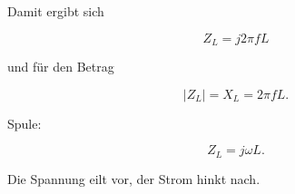 Damit ergibt sich

\begin{equation}
	\boxed{
		Z_L = j2\pi f L
	}
	\label{eq:endformel-impedanz-spule-frequenz}
\end{equation}

und für den Betrag

\begin{equation}
	\boxed{
		|Z_L| = X_L = 2\pi f L.
	}
	\label{eq:endformel-betrag-impedanz-spule}
\end{equation}

\begin{DidacticBox}
	\label{box:kurzer-merksatz-spule}
	Spule:
	
	\[
	Z_L = j\omega L.
	\]
	
	Die Spannung eilt vor, der Strom hinkt nach.
\end{DidacticBox}
